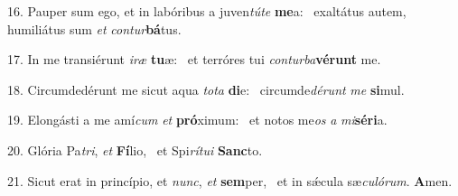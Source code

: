 16. Pauper sum ego, et in labóribus a juven\textit{tú}\textit{te} \textbf{me}a: \ast\  exaltátus autem, humiliátus sum \textit{et} \textit{con}\textit{tur}\textbf{bá}tus.\

17. In me transiérunt \textit{i}\textit{ræ} \textbf{tu}æ: \ast\  et terróres tui \textit{con}\textit{tur}\textit{ba}\textbf{vé}\textbf{runt} me.\

18. Circumdedérunt me sicut aqua \textit{to}\textit{ta} \textbf{di}e: \ast\  circumde\textit{dé}\textit{runt} \textit{me} \textbf{si}mul.\

19. Elongásti a me amí\textit{cum} \textit{et} \textbf{pró}ximum: \ast\  et notos me\textit{os} \textit{a} \textit{mi}\textbf{sé}\textbf{ri}a.\

20. Glória Pa\textit{tri}, \textit{et} \textbf{Fí}lio, \ast\  et Spi\textit{rí}\textit{tu}\textit{i} \textbf{Sanc}to.\

21. Sicut erat in princípio, et \textit{nunc}, \textit{et} \textbf{sem}per, \ast\  et in sǽcula sæ\textit{cu}\textit{ló}\textit{rum}. \textbf{A}men.\

